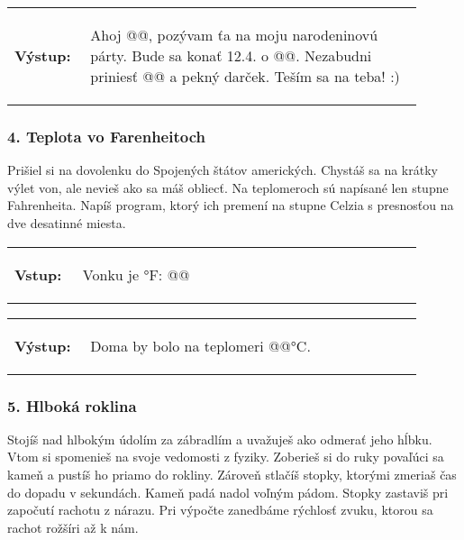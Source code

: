 \vspace{-2em}
\begin{tabular}{@{}p{0.15\linewidth}p{0.75\linewidth}}
\textbf{\small Výstup:} &
\vspace{-3em}
\begin{code}
Ahoj @\fbox{\phantom{vstup}}@,
pozývam ťa na moju narodeninovú párty.
Bude sa konať 12.4. o @\fbox{\phantom{vstup}}@.
Nezabudni priniesť @\fbox{\phantom{vstup}}@ a pekný darček.
Teším sa na teba! :)
\end{code}
\end{tabular}
\vspace{-2em}

\subsubsection*{4. Teplota vo Farenheitoch}
Prišiel si na dovolenku do Spojených štátov amerických. Chystáš sa na krátky výlet von, ale nevieš ako sa máš obliecť. Na teplomeroch sú napísané len stupne Fahrenheita. Napíš program, ktorý ich premení na stupne Celzia s presnosťou na dve desatinné miesta.

\begin{tabular}{@{}p{0.15\linewidth}p{0.75\linewidth}}
\textbf{\small Vstup:} &
\vspace{-3em}
\begin{code}
Vonku je °F: @\fbox{\phantom{vstup}}@
\end{code}
\end{tabular}

\vspace{-2em}
\begin{tabular}{@{}p{0.15\linewidth}p{0.75\linewidth}}
\textbf{\small Výstup:} &
\vspace{-3em}
\begin{code}
Doma by bolo na teplomeri @\fbox{\phantom{vstup}}@°C.
\end{code}
\end{tabular}
\vspace{-2em}

\subsubsection*{5. Hlboká roklina}
Stojíš nad hlbokým údolím za zábradlím a uvažuješ ako odmerať jeho hĺbku. Vtom si spomenieš na svoje vedomosti z fyziky. Zoberieš si do ruky povaľúci sa kameň a pustíš ho priamo do rokliny. Zároveň stlačíš stopky, ktorými zmeriaš čas do dopadu v sekundách. Kameň padá nadol voľným pádom. Stopky zastaviš pri započutí rachotu z nárazu. Pri výpočte zanedbáme rýchlosť zvuku, ktorou sa rachot rožšíri až k nám.

